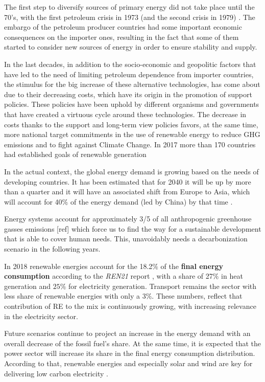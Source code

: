 The first step to diversify sources of primary energy did not take place until the 70's, with the first petroleum crisis in 1973 (and the second crisis in 1979) \cite*{Sorensen1991}. The embargo of the petroleum producer countries had some important economic consequences on the importer ones, resulting in the fact that some of them started to consider new sources of energy in order to ensure stability and supply.

In the last decades, in addition to the socio-economic and geopolitic factors that have led to the need of limiting petroleum dependence from importer countries, the stimulus for the big increase of these alternative technologies, has come about due to their decreasing costs, which have its origin in the promotion of support policies. These policies have been uphold by different organisms and governments that have created a virtuous cycle around these technologies. The decrease in costs thanks to the support and long-term view policies favors, at the same time, more national target commitments in the use of renewable energy to reduce GHG emissions and to fight against Climate Change. In 2017 more than 170 countries had established goals of renewable generation \cite*{IRENA2017}
 
In the actual context, the global energy demand is growing based on the needs of developing countries. It has been estimated that for 2040 it will be up by more than a quarter and it will have an associated shift from Europe to Asia, which will account for 40$\%$ of the energy demand (led by China) by that time \cite*{WEO2018}.

Energy systems account for approximately 3/5 of all anthropogenic greenhouse gasses emissions [ref] which force us to find the way for a sustainable development that is able to cover human needs. This, unavoidably needs a decarbonization scenario in the following years.  

In 2018 renewable energies account for the 18.2$\%$ of the \textbf{final energy consumption} according to the \textit{REN21} report \cite*{REN21}, with a share of 27$\%$ in heat generation and $25\%$ for electricity generation. Transport remains the sector with less share of renewable energies with only a $3\%$. These numbers, reflect that contribution of RE to the mix is continuously growing, with increasing relevance in the electricity sector.

Future scenarios continue to project an increase in the energy demand with an overall decrease of the fossil fuel's share. At the same time, it is expected that the power sector will increase its share in the final energy consumption distribution. According to that, renewable energies and especially solar and wind are key for delivering low carbon electricity \cite*{Troccoli2018}.

